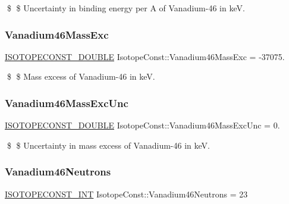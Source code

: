 \$ \$ Uncertainty in binding energy per A of Vanadium-\/46 in keV. \mbox{\label{group___isotope_const-_vanadium-_v46_ga7855d2f8d0c08ce22d4b8fd35862d925}} 
\subsubsection{\texorpdfstring{Vanadium46\+Mass\+Exc}{Vanadium46MassExc}}
{\footnotesize\ttfamily \mbox{\hyperlink{group___isotope_const-_macros_ga8f45a7272ce02c0b4c65c44636ed719a}{I\+S\+O\+T\+O\+P\+E\+C\+O\+N\+S\+T\+\_\+\+D\+O\+U\+B\+LE}} Isotope\+Const\+::\+Vanadium46\+Mass\+Exc = -\/37075.}

\$ \$ Mass excess of Vanadium-\/46 in keV. \mbox{\label{group___isotope_const-_vanadium-_v46_gac218448ccd22218773d4de202991b1ba}} 
\subsubsection{\texorpdfstring{Vanadium46\+Mass\+Exc\+Unc}{Vanadium46MassExcUnc}}
{\footnotesize\ttfamily \mbox{\hyperlink{group___isotope_const-_macros_ga8f45a7272ce02c0b4c65c44636ed719a}{I\+S\+O\+T\+O\+P\+E\+C\+O\+N\+S\+T\+\_\+\+D\+O\+U\+B\+LE}} Isotope\+Const\+::\+Vanadium46\+Mass\+Exc\+Unc = 0.}

\$ \$ Uncertainty in mass excess of Vanadium-\/46 in keV. \mbox{\label{group___isotope_const-_vanadium-_v46_gac577ac08fc86c220c2ee3a224f2f1bf3}} 
\subsubsection{\texorpdfstring{Vanadium46\+Neutrons}{Vanadium46Neutrons}}
{\footnotesize\ttfamily \mbox{\hyperlink{group___isotope_const-_macros_ga5f18360b3e99483a35c32d789e62621c}{I\+S\+O\+T\+O\+P\+E\+C\+O\+N\+S\+T\+\_\+\+I\+NT}} Isotope\+Const\+::\+Vanadium46\+Neutrons = 23}

